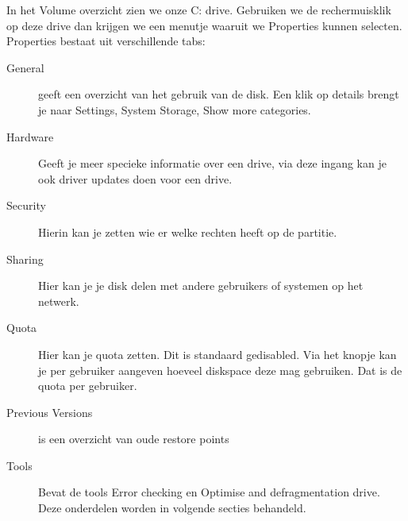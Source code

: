In het Volume overzicht zien we onze C: drive. Gebruiken we de rechermuisklik op deze drive dan krijgen we een menutje waaruit we Properties kunnen selecten. Properties bestaat uit verschillende tabs:
\begin{description}
\item[General] geeft een overzicht van het gebruik van de disk. Een klik op details brengt je naar Settings, System Storage, Show more categories.
\item[Hardware] Geeft je meer specieke informatie over een drive, via deze ingang kan je ook driver updates doen voor een drive.
\item[Security] Hierin kan je zetten wie er welke rechten heeft op de partitie.
\item[Sharing] Hier kan je je disk delen met andere gebruikers of systemen op het netwerk.
\item[Quota] Hier kan je quota zetten. Dit is standaard gedisabled. Via het knopje  kan je per gebruiker aangeven hoeveel diskspace deze mag gebruiken. Dat is de quota per gebruiker.
\item[Previous Versions] is een overzicht van oude restore points
\item[Tools] Bevat de tools Error checking en Optimise and defragmentation drive. Deze onderdelen worden in volgende secties behandeld.
\end{description}

